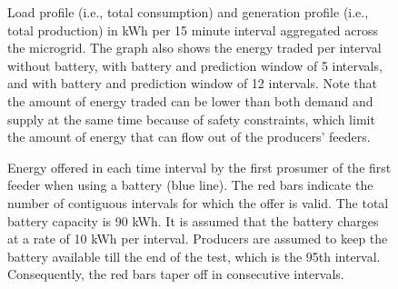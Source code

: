 \begin{figure}[t]
\caption{Load profile (i.e., total consumption) and generation profile (i.e., total production) in kWh per 15 minute interval aggregated across the microgrid.  The graph also shows the energy traded per interval without battery, with battery and prediction window of 5 intervals, and with battery and prediction window of 12 intervals. Note that the amount of energy traded can be lower than both demand and supply at the same time because of safety constraints, which limit the amount of energy that can flow out of the producers' feeders.}
\label{fig:profile}
\end{figure}



\begin{figure}[ht]
\caption{Energy offered in each time interval by the first prosumer of the first feeder when using a battery (blue line). The red bars indicate the number of contiguous intervals for which the offer is valid. The total battery capacity is 90 kWh. It is assumed that the battery charges at a rate of 10 kWh per interval. Producers are assumed to keep the battery available till the end of the test, which is the 95th interval. Consequently, the red bars taper off in consecutive intervals.}
\label{fig:batteryEffect}
\end{figure}

